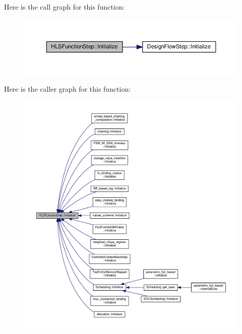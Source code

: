 Here is the call graph for this function\+:
\nopagebreak
\begin{figure}[H]
\begin{center}
\leavevmode
\includegraphics[width=350pt]{d9/d41/classHLSFunctionStep_a966629ba62a8188ff4fa783ab0d4e319_cgraph}
\end{center}
\end{figure}
Here is the caller graph for this function\+:
\nopagebreak
\begin{figure}[H]
\begin{center}
\leavevmode
\includegraphics[width=350pt]{d9/d41/classHLSFunctionStep_a966629ba62a8188ff4fa783ab0d4e319_icgraph}
\end{center}
\end{figure}
\mbox{\label{classHLSFunctionStep_a8db4c00d080655984d98143206fc9fa8}} 
